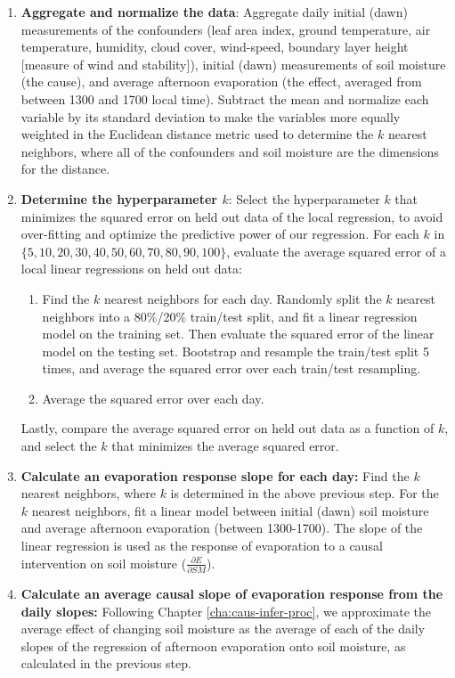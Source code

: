 \documentclass[12pt]{article}
\begin{document}
\begin{enumerate}
\item \textbf{Aggregate and normalize the data}: Aggregate daily
  initial (dawn) measurements of the confounders (leaf area index,
  ground temperature, air temperature, humidity, cloud cover,
  wind-speed, boundary layer height [measure of wind and stability]),
  initial (dawn) measurements of soil moisture (the cause), and
  average afternoon evaporation (the effect, averaged from between
  1300 and 1700 local time). Subtract the mean and normalize each
  variable by its standard deviation to make the variables more
  equally weighted in the Euclidean distance metric used to determine
  the $k$ nearest neighbors, where all of the confounders and soil
  moisture are the dimensions for the distance.
  \item \textbf{Determine the hyperparameter $k$}: Select the
    hyperparameter $k$ that minimizes the squared error on held out
    data of the local regression, to avoid over-fitting and optimize
    the predictive power of our regression. For each $k$ in $\{5, 10,
    20, 30, 40, 50, 60, 70, 80, 90, 100\}$, evaluate the average
    squared error of a local linear regressions on held out data:
    \begin{enumerate}
    \item{Find the $k$ nearest neighbors for each day. Randomly split
      the $k$ nearest neighbors into a 80\%/20\% train/test split, and
      fit a linear regression model on the training set. Then evaluate
      the squared error of the linear model on the testing
      set. Bootstrap and resample the train/test split 5 times, and
      average the squared error over each train/test
      resampling.}
    \item{Average the squared error over each day.}
    \end{enumerate}
    Lastly, compare the average squared error on held out data as a function
    of $k$, and select the $k$ that minimizes the average squared error.
  \item \textbf{Calculate an evaporation response slope for each day:}
    Find the $k$ nearest neighbors, where $k$ is determined in the
    above previous step. For the $k$ nearest neighbors, fit a linear
    model between initial (dawn) soil moisture and average afternoon
    evaporation (between 1300-1700). The slope of the linear
    regression is used as the response of evaporation to a causal
    intervention on soil moisture ($\frac{\partial E}{\partial SM}$).
  \item \textbf{Calculate an average causal slope of evaporation
    response from the daily slopes:} Following
    Chapter \ref{cha:caus-infer-proc}, we approximate the average
    effect of changing soil moisture as the average of each of the
    daily slopes of the regression of afternoon evaporation onto soil
    moisture, as calculated in the previous step.
\end{enumerate}
\end{document}
